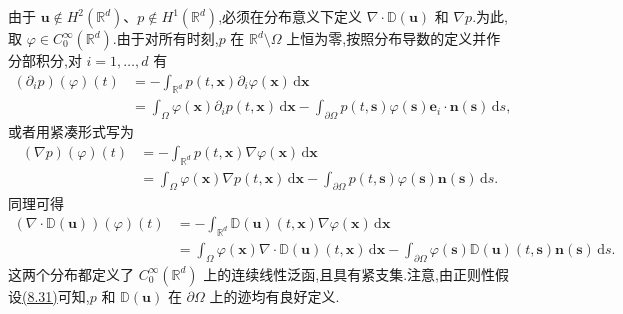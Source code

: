 \begin{note}[压力项与黏性项的延拓]
\label{note:extension-pressure-viscous-terms}
由于 $\bm{u}\notin H^2(\mathbb{R}^d)$、$p\notin H^1(\mathbb{R}^d)$,必须在分布意义下定义 $\nabla\cdot\mathbb{D}(\bm{u})$ 和 $\nabla p$.为此,取 $\varphi\in C_0^\infty(\mathbb{R}^d)$.由于对所有时刻,$p$ 在 $\mathbb{R}^d\setminus\Omega$ 上恒为零,按照分布导数的定义并作分部积分,对 $i=1,\ldots,d$ 有
\[
\begin{aligned}
 (\partial_i p)(\varphi)(t)
  &=-\int_{\mathbb{R}^d}
        p(t,\bm{x})\partial_i\varphi(\bm{x})
        \,\mathrm{d}\bm{x}\\
  &=\int_\Omega
       \varphi(\bm{x})\partial_i p(t,\bm{x})
       \,\mathrm{d}\bm{x}
    -\int_{\partial\Omega}
       p(t,\bm{s})\varphi(\bm{s})
       \bm{e}_i\cdot\bm{n}(\bm{s})\,\mathrm{d}s,
\end{aligned}
\]
或者用紧凑形式写为
\begin{equation}\label{eq:distributional-pressure-gradient}
\begin{aligned}
 (\nabla p)(\varphi)(t)
  &=-\int_{\mathbb{R}^d}
      p(t,\bm{x})\nabla\varphi(\bm{x})
      \,\mathrm{d}\bm{x}\\
  &=\int_\Omega
       \varphi(\bm{x})\nabla p(t,\bm{x})
       \,\mathrm{d}\bm{x}
    -\int_{\partial\Omega}
       p(t,\bm{s})\varphi(\bm{s})
       \bm{n}(\bm{s})\,\mathrm{d}s.
\end{aligned}
\end{equation}
同理可得
\begin{equation}\label{eq:distributional-viscous-divergence}
\begin{aligned}
 (\nabla\cdot\mathbb{D}(\bm{u}))(\varphi)(t)
  &=-\int_{\mathbb{R}^d}
       \mathbb{D}(\bm{u})(t,\bm{x})
       \nabla\varphi(\bm{x})\,\mathrm{d}\bm{x}\\
  &=\int_\Omega
       \varphi(\bm{x})\nabla\cdot\mathbb{D}(\bm{u})(t,\bm{x})
       \,\mathrm{d}\bm{x}
    -\int_{\partial\Omega}
       \varphi(\bm{s})\mathbb{D}(\bm{u})(t,\bm{s})
       \bm{n}(\bm{s})\,\mathrm{d}s.
\end{aligned}
\end{equation}
这两个分布都定义了 $C_0^\infty(\mathbb{R}^d)$ 上的连续线性泛函,且具有紧支集.注意,由正则性假设\hyperref[eq:les-bounded-domain-regularity]{(8.31)}可知,$p$ 和 $\mathbb{D}(\bm{u})$ 在 $\partial\Omega$ 上的迹均有良好定义.
\end{note}

